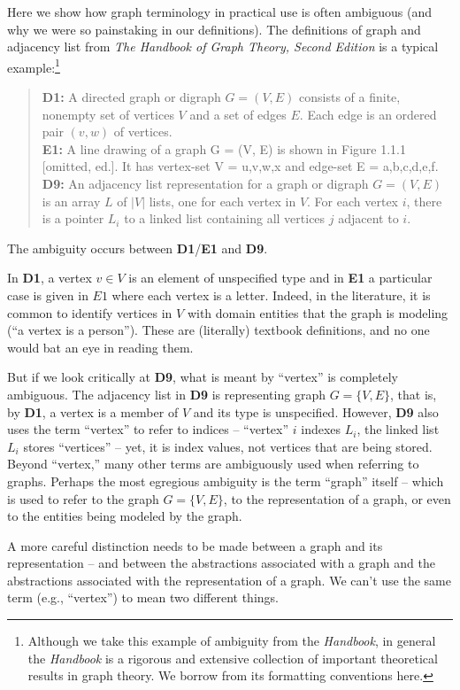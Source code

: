 Here we show how graph terminology in practical use is often ambiguous (and why we were so painstaking in our definitions).
The definitions of graph and adjacency list from \emph{The Handbook of Graph Theory, Second Edition} is a typical
example:\footnote{
Although we take this example of ambiguity
from the \emph{Handbook}, in general the \emph{Handbook} is a rigorous and extensive collection of
important theoretical results in graph theory.  We borrow from its formatting conventions here.
}
\begin{quote}
  \textbf{D1:} A directed graph or digraph $G = (V,E)$ consists of a finite, nonempty set of vertices $V$ and a set of edges $E$.
Each edge is an ordered pair $(v,w)$ of vertices.
\\[\medskipamount]
\textbf{E1:} A line drawing of a graph G = (V, E) is shown in Figure 1.1.1 [omitted, ed.]. It has vertex-set V = {u,v,w,x} and
edge-set E = {a,b,c,d,e,f}.
\\[\medskipamount]
\textbf{D9:} An adjacency list representation for a graph or digraph $G = (V, E)$ is an array $L$ of $|V|$ lists, one for each
vertex in $V$. For each vertex $i$, there is a pointer $L_i$ to a linked list containing all vertices $j$ adjacent to $i$.
\end{quote}
The ambiguity occurs between \textbf{D1}/\textbf{E1} and \textbf{D9}.

In \textbf{D1}, a vertex $v \in V$ is an element of unspecified type and in \textbf{E1} a particular case is given in $E1$ where
each vertex is a letter.  Indeed, in the literature, it is common to identify vertices in $V$ with domain entities that the graph
is modeling (``a vertex is a person'').  These are (literally) textbook definitions, and no one would bat an eye in reading them.

But if we look critically at \textbf{D9}, what is meant by ``vertex'' is completely ambiguous.  The adjacency list
in \textbf{D9} is representing graph $G=\{ V, E\}$, that is, by \textbf{D1}, a vertex is a member of $V$ and its type is
unspecified.  However, \textbf{D9} also uses the term ``vertex'' to refer to indices -- ``vertex'' $i$ indexes $L_i$, the linked list   
$L_i$ stores ``vertices'' -- yet, it is index values, not vertices that are being stored.  Beyond ``vertex,'' many other terms are
 ambiguously used when referring to graphs.  Perhaps the most egregious ambiguity is the term ``graph'' itself -- which is used to 
refer to the graph $G=\{ V, E \}$, to the representation of a graph, or even to the entities being modeled by the graph.

A more careful distinction needs to be made between a graph and its representation -- and between the abstractions associated with
a graph and the abstractions associated with the representation of a graph.  We can't use the same term (e.g., ``vertex'') to mean
two different things.
